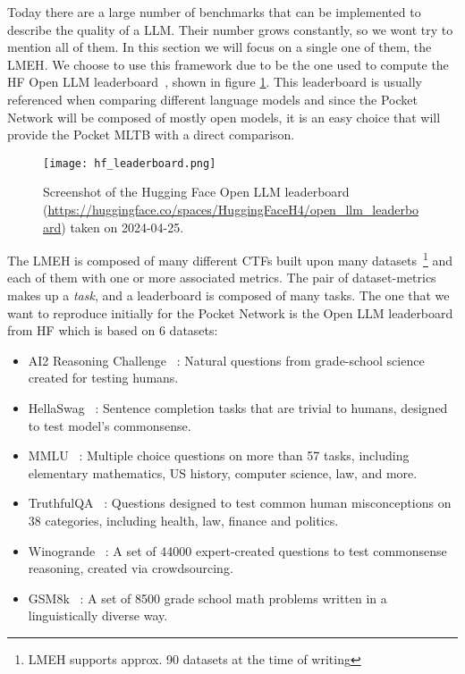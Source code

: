 Today there are a large number of benchmarks that can be implemented to describe the quality of a \gls{LLM}. Their number grows constantly, so we wont try to mention all of them. In this section we will focus on a single one of them, the \gls{LMEH}.
We choose to use this framework due to be the one used to compute the \gls{HF} Open \gls{LLM} leaderboard~\cite{open-llm-leaderboard}, shown in figure \ref{fig:hf_leaderboard}. This leaderboard is usually referenced when comparing different language models and since the Pocket Network will be composed of mostly open models, it is an easy choice that will provide the Pocket \gls{MLTB} with a direct comparison.

\begin{figure}[H]
    \centering
    \texttt{[image: hf\_leaderboard.png]}
    \caption{Screenshot of the Hugging Face Open LLM leaderboard (\url{https://huggingface.co/spaces/HuggingFaceH4/open_llm_leaderboard}) taken on 2024-04-25.}
    \label{fig:hf_leaderboard}
\end{figure}

The \gls{LMEH} is composed of many different \gls{CTF}s built upon many datasets~\footnote{\gls{LMEH} supports approx. 90 datasets at the time of writing} and each of them with one or more associated metrics. The pair of dataset-metrics makes up a \emph{task}, and a leaderboard is composed of many tasks. The one that we want to reproduce initially for the Pocket Network is the Open \gls{LLM} leaderboard from \gls{HF} which is based on 6 datasets:
\begin{itemize}
    \item AI2 Reasoning Challenge~\cite{clark2018think} : Natural questions from grade-school science created for testing humans.
    \item HellaSwag~\cite{zellers2019hellaswag} : Sentence completion tasks that are trivial to humans, designed to test model's commonsense.
    \item MMLU~\cite{hendrycks2020measuring} : Multiple choice questions on more than 57 tasks, including elementary mathematics, US history, computer science, law, and more.
    \item TruthfulQA~\cite{lin2021truthfulqa} : Questions designed to test common human misconceptions on 38 categories, including health, law, finance and politics.
    \item Winogrande~\cite{sakaguchi2019adversarial} : A set of 44000 expert-created questions to test commonsense reasoning, created via crowdsourcing.
    \item GSM8k~\cite{cobbe2021training} : A set of 8500 grade school math problems written in a linguistically diverse way.
\end{itemize}

